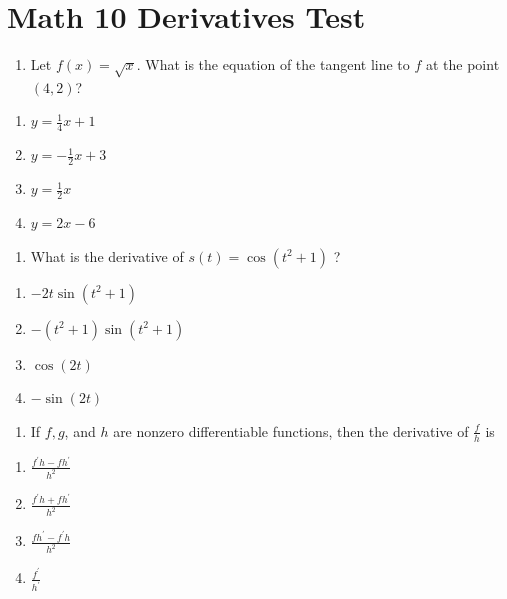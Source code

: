 \section{Math 10 Derivatives Test}\label{math-10-derivatives-test}

\begin{enumerate}
\def\labelenumi{\arabic{enumi}.}
\tightlist
\item
  Let \(f(x)=\sqrt{x}\). What is the equation of the tangent line to
  \(f\) at the point \((4,2)\)?
\end{enumerate}

\begin{enumerate}
\def\labelenumi{(\Alph{enumi})}
\item
  \(y=\frac{1}{4} x+1\)
\item
  \(y=-\frac{1}{2} x+3\)
\item
  \(y=\frac{1}{2} x\)
\item
  \(y=2 x-6\)
\end{enumerate}

\begin{enumerate}
\def\labelenumi{\arabic{enumi}.}
\tightlist
\item
  What is the derivative of \(s(t)=\cos \left(t^2 + 1\right)\) ?
\end{enumerate}

\begin{enumerate}
\def\labelenumi{(\Alph{enumi})}
\item
  \(-2t\sin(t^2+1)\)
\item
  \(-(t^2+1)\sin(t^2+1)\)
\item
  \(\cos(2t)\)
\item
  \(-\sin(2t)\)
\end{enumerate}

\begin{enumerate}
\def\labelenumi{\arabic{enumi}.}
\setcounter{enumi}{2}
\tightlist
\item
  If \(f, g\), and \(h\) are nonzero differentiable functions, then the
  derivative of \(\frac{f}{h}\) is
\end{enumerate}

\begin{enumerate}
\def\labelenumi{(\Alph{enumi})}
\item
  \(\frac{f^{\prime} h - f h^{\prime}}{h^2}\)
\item
  \(\frac{f^{\prime} h + f h^{\prime}}{h^2}\)
\item
  \(\frac{f h^{\prime} - f^{\prime} h}{h^{2}}\)
\item
  \(\frac{f^{\prime}}{h^{\prime}}\)
\end{enumerate}

